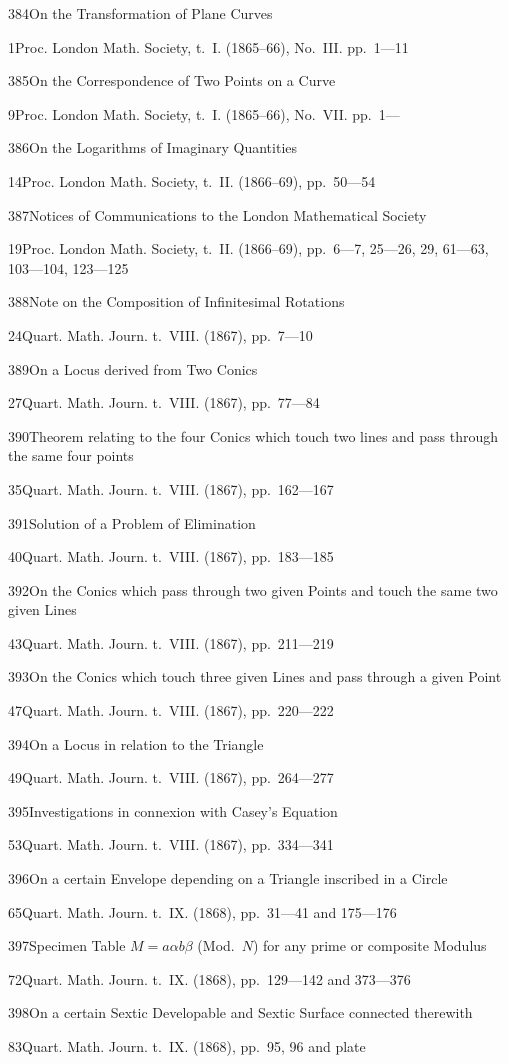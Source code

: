 \documentclass[11pt,a4paper]{book}
\providecommand{\tocentry}[2]{#1\dotfill #2\par}
\begin{document}
\tocentry{384}{On the Transformation of Plane Curves}{1}{Proc. London Math. Society, t.~I. (1865--66), No.~III. pp.~1---11}

\tocentry{385}{On the Correspondence of Two Points on a Curve}{9}{Proc. London Math. Society, t.~I. (1865--66), No.~VII. pp.~1---}

\tocentry{386}{On the Logarithms of Imaginary Quantities}{14}{Proc. London Math. Society, t.~II. (1866--69), pp.~50---54}

\tocentry{387}{Notices of Communications to the London Mathematical Society}{19}{Proc. London Math. Society, t.~II. (1866--69), pp.~6---7, 25---26, 29, 61---63, 103---104, 123---125}

\tocentry{388}{Note on the Composition of Infinitesimal Rotations}{24}{Quart. Math. Journ. t.~VIII. (1867), pp.~7---10}

\tocentry{389}{On a Locus derived from Two Conics}{27}{Quart. Math. Journ. t.~VIII. (1867), pp.~77---84}

\tocentry{390}{Theorem relating to the four Conics which touch two lines and pass through the same four points}{35}{Quart. Math. Journ. t.~VIII. (1867), pp.~162---167}

\tocentry{391}{Solution of a Problem of Elimination}{40}{Quart. Math. Journ. t.~VIII. (1867), pp.~183---185}

\tocentry{392}{On the Conics which pass through two given Points and touch the same two given Lines}{43}{Quart. Math. Journ. t.~VIII. (1867), pp.~211---219}

\tocentry{393}{On the Conics which touch three given Lines and pass through a given Point}{47}{Quart. Math. Journ. t.~VIII. (1867), pp.~220---222}

\tocentry{394}{On a Locus in relation to the Triangle}{49}{Quart. Math. Journ. t.~VIII. (1867), pp.~264---277}

\tocentry{395}{Investigations in connexion with Casey's Equation}{53}{Quart. Math. Journ. t.~VIII. (1867), pp.~334---341}

\newpage

\tocentry{396}{On a certain Envelope depending on a Triangle inscribed in a Circle}{65}{Quart. Math. Journ. t.~IX. (1868), pp.~31---41 and 175---176}

\tocentry{397}{Specimen Table $M = a\alpha b\beta$ (Mod.~$N$) for any prime or composite Modulus}{72}{Quart. Math. Journ. t.~IX. (1868), pp.~129---142 and 373---376}

\tocentry{398}{On a certain Sextic Developable and Sextic Surface connected therewith}{83}{Quart. Math. Journ. t.~IX. (1868), pp.~95, 96 and plate}
\end{document}
